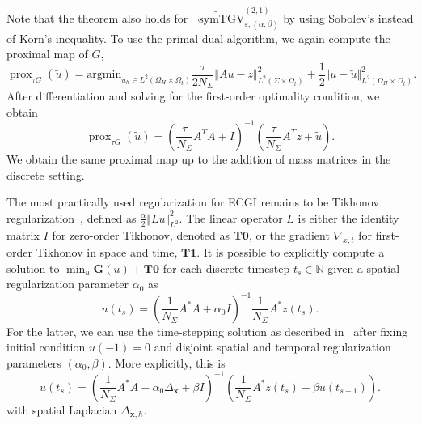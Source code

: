 \documentclass{article}
\DeclareMathOperator*{\prox}{prox}
\newcommand{\x}{\mathbf{x}}
\newcommand{\N}{\mathbb{N}}
\newcommand{\NSymTGV}{\neg \mathrm{symTGV}}
\newcommand{\OmegaTime}{\Omega_t}
\begin{document}
	Note that the theorem also holds for $\widetilde{\NSymTGV}_{\varepsilon, (\alpha, \beta)}^{(2, 1)}$ by using Sobolev's instead of Korn's inequality.
	To use the primal-dual algorithm, we again compute the proximal map of $G$,
	\begin{equation*}
		\prox_{\tau G}(\widetilde{u})=\mathrm{argmin}_{u_h \in L^2(\Omega_H\times\OmegaTime)} \frac{\tau}{2 N_\Sigma}\Vert Au - z\Vert_{L^2(\Sigma \times \OmegaTime)} ^2+  \frac{1}{2} \Vert u - \widetilde{u}\Vert_{L^2(\Omega_H\times\OmegaTime)}^2 .
	\end{equation*}
	After differentiation and solving for the first-order optimality condition, we obtain
	\begin{equation*}
		\prox_{\tau G}(\widetilde{u}) = \left(\frac{\tau}{N_\Sigma}A^TA + I\right)^{-1}\left(\frac{\tau}{N_\Sigma}A^Tz + \widetilde{u}\right).
	\end{equation*}
	We obtain the same proximal map up to the addition of mass matrices in the discrete setting.
	
	The most practically used regularization for ECGI remains to be Tikhonov regularization~\cite{Li25, Ti77}, defined as
	$
	\frac{\alpha}{2}\Vert Lu\Vert_{L^2}^2. 
	$
	The linear operator $L$ is either the identity matrix $I$ for zero-order Tikhonov, denoted as $\mathbf{T0}$, or the gradient $\nabla_{x, t}$ for first-order Tikhonov in space and time, $\mathbf{T1}$.
	It is possible to explicitly compute a solution to $\min_u \mathbf{G}(u) + \mathbf{T0}$ for each discrete timestep $t_s\in\N$ given a spatial regularization parameter $\alpha_0$ as
	\begin{equation*}
		u(t_s) = \left( \frac{1}{N_\Sigma} A^*A + \alpha_0 I\right)^{-1}\frac{1}{N_\Sigma}A^*z(t_s).
	\end{equation*}
	For the latter, we can use the time-stepping solution as described in~\cite[Section 5.1]{Ha25} after fixing initial condition $u(-1)=0$ and disjoint spatial and temporal regularization parameters $(\alpha_0, \beta)$.
	More explicitly, this is
	\begin{equation*}
		u(t_s) = (\frac{1}{ N_\Sigma}A^*A - \alpha_0 \Delta_{\x} + \beta I)^{-1}(\frac{1}{N_\Sigma}A^*z(t_s)+\beta u(t_{s-1})).
	\end{equation*}
	with spatial Laplacian $\Delta_{\x,h}$.
	
\end{document}
